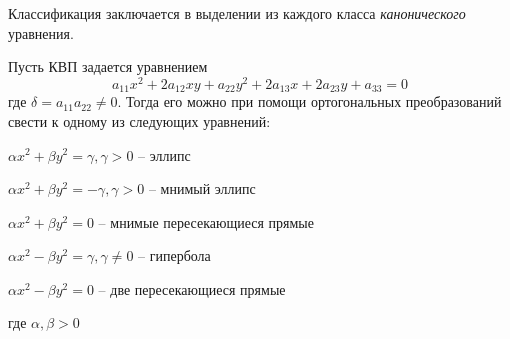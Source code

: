 \begin{Rem}
	Классификация заключается в выделении из каждого класса \textit{канонического} уравнения.
\end{Rem}

\begin{Thm}
	Пусть КВП задается уравнением
	\[a_{11} x^2 + 2a_{12} xy + a_{22} y^2 + 2a_{13}x + 2a_{23}y + a_{33} = 0\]
	где $\delta = a_{11} a_{22} \neq 0$. Тогда его можно при помощи ортогональных преобразований свести к одному из следующих уравнений:
	\begin{MyList}
		\item $\alpha x^2 + \beta y^2 = \gamma, \gamma > 0$ -- эллипс
		\item $\alpha x^2 + \beta y^2 = -\gamma, \gamma > 0$ -- мнимый эллипс
		\item $\alpha x^2 + \beta y^2 = 0$ -- мнимые пересекающиеся прямые
		\item $\alpha x^2 - \beta y^2 = \gamma, \gamma \neq 0$ -- гипербола
		\item $\alpha x^2 - \beta y^2 = 0$ -- две пересекающиеся прямые  
	\end{MyList}
	где $\alpha, \beta > 0$ 
\end{Thm}

